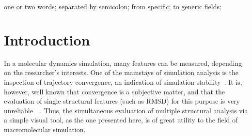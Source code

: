\documentclass[10pt, conference]{IEEEtran}
\begin{document}
\maketitle


\begin{abstract}

%
\end{abstract}

\begin{IEEEkeywords}
one or two words; separated by semicolon; from specific; to generic fields;

\end{IEEEkeywords}


\IEEEpeerreviewmaketitle




\section{Introduction}
%

In a molecular dynamics simulation, many features can be measured, depending on the researcher’s interests. One of the mainstays of simulation analysis is the inspection of trajectory convergence, an indication of simulation stability~\cite{grossfield2007convergence}. It is, however, well known that convergence is a subjective matter, and that the evaluation of single structural features (such as RMSD) for this purpose is very unreliable~\cite{knapp2011intuitive}~\cite{van2006biomolecular}. Thus, the simultaneous evaluation of multiple structural analysis via a simple visual tool, as the one presented here, is of great utility to the field of macromolecular simulation.
\end{document}
